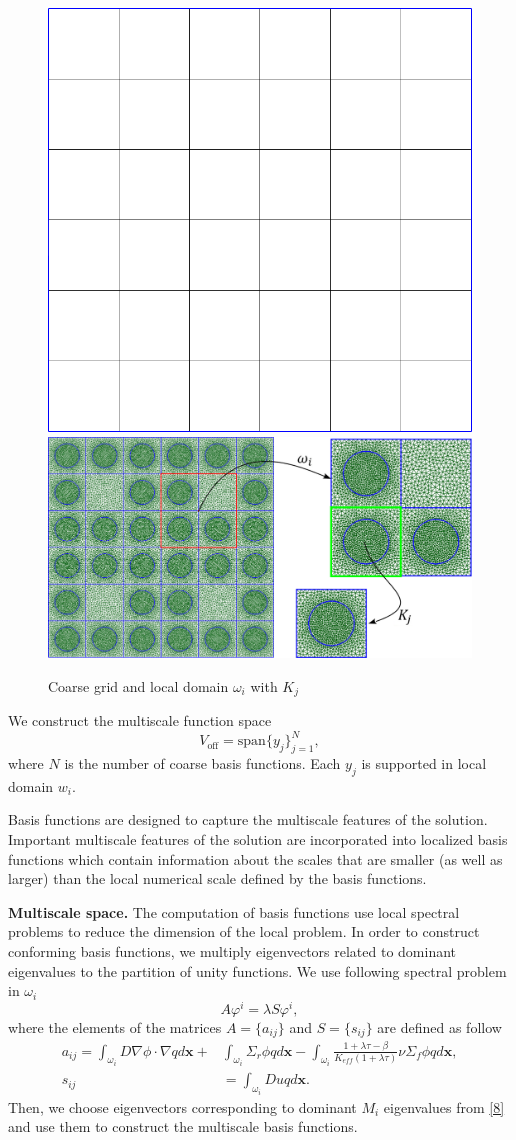\documentclass[10pt]{article}
\begin{document}
\begin{figure}[h!]
	\centering
		\includegraphics[width=0.3\linewidth]{coarse_grid.png} \hspace{2em}
		\includegraphics[width=0.57\linewidth]{omega.png}
	\caption{Coarse grid and local domain $\omega_i$ with $K_j$}
	\label{p1}
\end{figure}

We construct the multiscale function space
\[
	{V}_{\text{off}} = \mbox{span} \{ y_j \}_{j=1}^{N},
\]
where $N$ is the number of coarse basis functions.
Each $y_j$ is supported in local domain $w_i$.

Basis functions are designed to capture the multiscale features of the solution.
Important multiscale features of the solution are incorporated into localized basis functions which contain information about the scales that are smaller (as well as larger) than the local numerical scale defined by the basis functions.

\textbf{Multiscale space.}
The computation of basis functions use local spectral problems to reduce the dimension of the local problem.
In order to construct conforming basis functions, we multiply eigenvectors related to dominant eigenvalues to the partition of unity functions.
We use following spectral problem in $\omega_i$
\begin{equation} \label{8}
	A \varphi^i = \lambda S \varphi^i,
\end{equation}
where the elements of the matrices $A= \{ a_{ij} \}$ and $S = \{ s_{ij} \}$ are defined as follow{
\begin{equation} \label{9}
\begin{split}
	a_{ij} =
	\int_{\omega_i} D \nabla \phi \cdot \nabla q d \bm x + &
	\int_{\omega_i} \Sigma_r \phi q d \bm x -
	\int_{\omega_i} \frac{1 + \lambda \tau - \beta}{K_{eff}(1 + \lambda \tau)} \nu \Sigma_f \phi q d \bm x, \\
	s_{ij} & = \int_{\omega _i} D u q d \bm x.
\end{split}
\end{equation}}
Then, we choose eigenvectors corresponding to dominant $M_{i}$ eigenvalues from \eqref{8} and use them to construct the multiscale basis functions.
\end{document}
